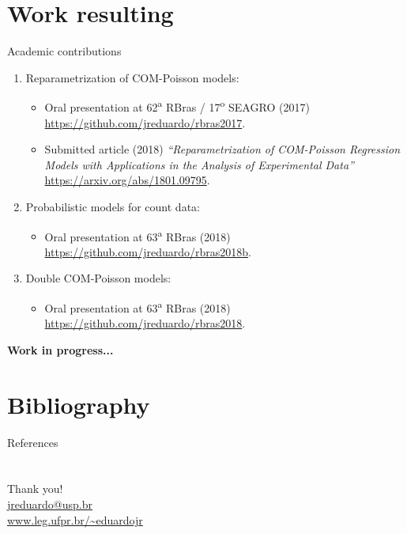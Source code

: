 \documentclass[11pt]{beamer}\usepackage[]{graphicx}\usepackage[]{color}
\begin{document}
\section{Work resulting}

\begin{frame}{Academic contributions}

  \begin{enumerate}
  \item Reparametrization of COM-Poisson models:
    \begin{itemize}
      \setlength{\itemindent}{-0.4cm}
    \item Oral presentation at 62\textsuperscript{a} RBras /
      17\textsuperscript{o} SEAGRO (2017)\\
      \url{https://github.com/jreduardo/rbras2017}.
    \item Submitted article (2018) \textit{``Reparametrization of
        COM-Poisson Regression Models with Applications in the
        Analysis of Experimental Data''}\\
      \url{https://arxiv.org/abs/1801.09795}.
    \end{itemize}
  \item Probabilistic models for count data:
    \begin{itemize}
      \setlength{\itemindent}{-0.4cm}
    \item Oral presentation at 63\textsuperscript{a} RBras (2018)\\
      \url{https://github.com/jreduardo/rbras2018b}.
    \end{itemize}
  \item Double COM-Poisson models:
    \begin{itemize}
      \setlength{\itemindent}{-0.4cm}
    \item Oral presentation at 63\textsuperscript{a} RBras (2018)\\
      \url{https://github.com/jreduardo/rbras2018}.
    \end{itemize}
  \end{enumerate}
  \vspace{0.3cm}
  \textbf{Work in progress...}
  \vspace{0.4cm}
\end{frame}

\section*{Bibliography}
\begin{frame}[allowframebreaks, t]{References}
  \footnotesize
  \vspace*{-0.5cm} \nocite{RibeiroJr2018}
  
\end{frame}

\section*{}
\begin{frame}
  \centering
  \textcolor{col}{\Huge Thank you!}\\[0.5cm]
  \url{jreduardo@usp.br}\\
  \url{www.leg.ufpr.br/~eduardojr}
\end{frame}
\end{document}
